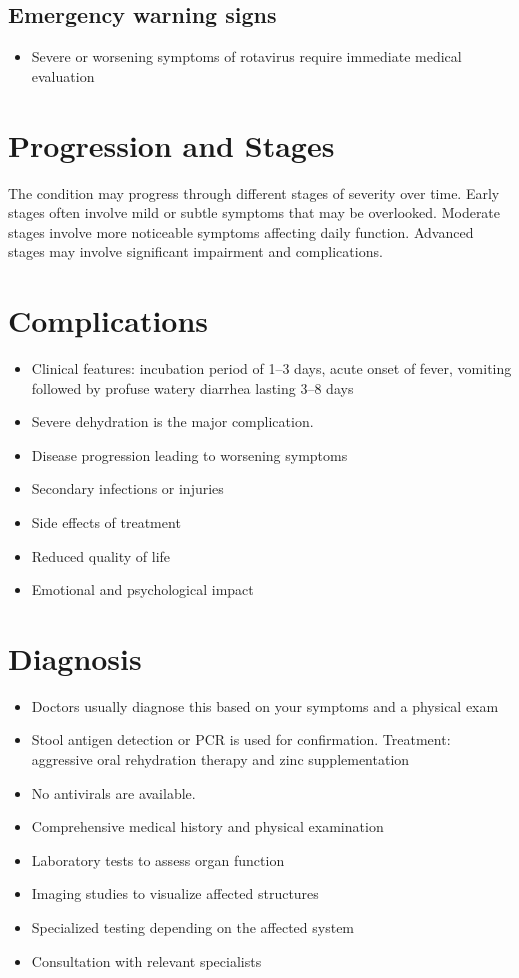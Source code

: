 \subsection{Emergency warning signs}
\begin{itemize}[noitemsep]
  \item Severe or worsening symptoms of rotavirus require immediate medical evaluation
\end{itemize}
\section{Progression and Stages}
The condition may progress through different stages of severity over time. Early stages often involve mild or subtle symptoms that may be overlooked. Moderate stages involve more noticeable symptoms affecting daily function. Advanced stages may involve significant impairment and complications.
\section{Complications}
\begin{itemize}[noitemsep]
  \item Clinical features: incubation period of 1--3 days, acute onset of fever, vomiting followed by profuse watery diarrhea lasting 3--8 days
  \item Severe dehydration is the major complication.
  \item Disease progression leading to worsening symptoms
  \item Secondary infections or injuries
  \item Side effects of treatment
  \item Reduced quality of life
  \item Emotional and psychological impact
\end{itemize}
\section{Diagnosis}
\begin{itemize}[noitemsep]
  \item Doctors usually diagnose this based on your symptoms and a physical exam
  \item Stool antigen detection or PCR is used for confirmation. Treatment: aggressive oral rehydration therapy and zinc supplementation
  \item No antivirals are available.
  \item Comprehensive medical history and physical examination
  \item Laboratory tests to assess organ function
  \item Imaging studies to visualize affected structures
  \item Specialized testing depending on the affected system
  \item Consultation with relevant specialists
\end{itemize}
